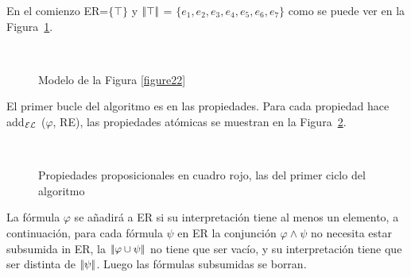 En el comienzo ER=$\{\top\}$ y $|\!|\top|\!|$ = $\{e_1, e_2, e_3, e_4, e_5, e_6, e_7\}$ como se puede ver en la Figura~\ref{fig-modelo}.\\

\begin{figure}[ht]
\begin{center}
\\[0pt]
\caption{Modelo de la Figura \ref{figure22}}
\label{fig-modelo}
\end{center}
\end{figure}
El primer bucle del algoritmo es en las propiedades. Para cada propiedad hace add$_\mathcal{EL}$ ($\varphi$, RE), las propiedades at\'omicas se muestran en la Figura~\ref{fig-modelo2}.

\begin{figure}[ht]
\begin{center}
\\[0pt]
\caption{Propiedades proposicionales en cuadro rojo, las del primer ciclo del algoritmo}
\label{fig-modelo2}
\end{center}
\end{figure}

La f\'ormula $\varphi$ se a\~nadir\'a a ER si su interpretaci\'on tiene al menos un elemento, a continuaci\'on, para cada f\'ormula
 $\psi$ en ER la conjunci\'on
$\varphi  \wedge \psi$ no necesita estar subsumida in ER, la $|\!|\varphi \cup \psi|\!|$ no tiene que ser vac\'io, y su interpretaci\'on tiene que ser distinta de $|\!|\psi|\!|$. Luego las f\'ormulas subsumidas se borran.

